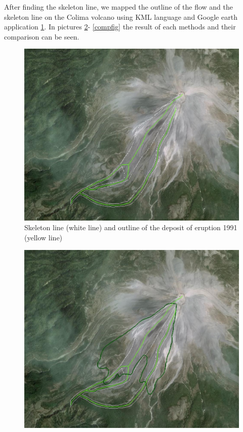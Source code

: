 \documentclass[letterpaper,10pt]{article}
\begin{document}
\newpage

After finding the skeleton line, we mapped the outline of the flow and the skeleton line on the Colima volcano 
using KML language and Google earth application \ref{skel_outline}. In pictures \ref{phasecolima}- \ref{compfig} the result of each methods and their comparison can be seen. 

\begin{figure}[H]
\centerline{\includegraphics[width=\textwidth]{IMAGES/skeleton_outline1.jpg}}
\caption{Skeleton line (white line) and outline of the deposit of eruption 1991 (yellow line)}
\label{skel_outline}
\end{figure}

\begin{figure}[H]
\centerline{\includegraphics[width=\textwidth]{IMAGES/phasefield1.jpg}}
\caption{}
\label{phasecolima}
\end{figure}
\end{document}
